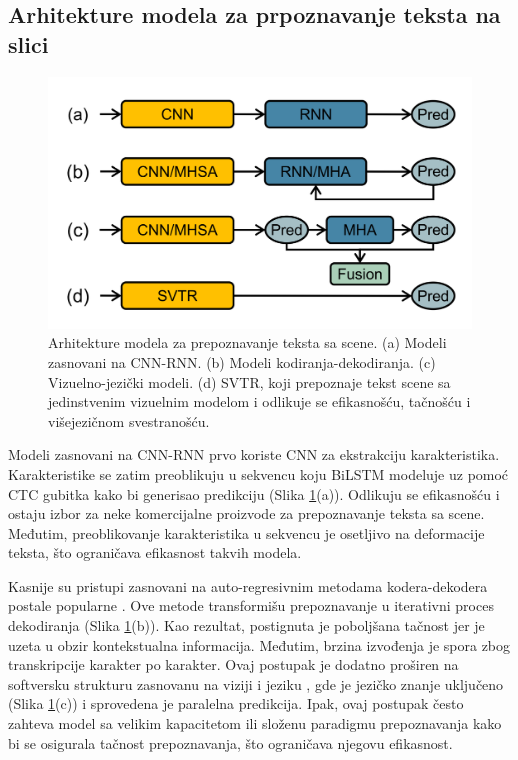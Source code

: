 \documentclass[a4paper,12pt]{article}
\begin{document}
	\subsection{Arhitekture modela za prpoznavanje teksta na slici}
	
	\begin{figure}[H]
		\centering
		\includegraphics[width=\textwidth]{assets/text-recognition-model-architectures.png}
		\caption{Arhitekture modela za prepoznavanje teksta sa scene. (a) Modeli zasnovani na CNN-RNN. (b) Modeli kodiranja-dekodiranja. (c) Vizuelno-jezički modeli. (d) SVTR, koji prepoznaje tekst scene sa jedinstvenim vizuelnim modelom i odlikuje se efikasnošću, tačnošću i višejezičnom svestranošću.}
		\label{fig:tr-model-architectures}
	\end{figure}
	
	Modeli zasnovani na CNN-RNN \cite{shi2015endtoend} prvo koriste CNN za ekstrakciju karakteristika. Karakteristike se zatim preoblikuju u sekvencu koju BiLSTM modeluje uz pomoć CTC gubitka kako bi generisao predikciju (Slika \ref{fig:tr-model-architectures}(a)). Odlikuju se efikasnošću i ostaju izbor za neke komercijalne proizvode za prepoznavanje teksta sa scene. Međutim, preoblikovanje karakteristika u sekvencu je osetljivo na deformacije teksta, što ograničava efikasnost takvih modela.
	
	Kasnije su pristupi zasnovani na auto-regresivnim metodama kodera-dekodera postale popularne \cite{sheng2019nrtr, li2019show, zheng2023cdistnet}. Ove metode transformišu prepoznavanje u iterativni proces dekodiranja (Slika \ref{fig:tr-model-architectures}(b)). Kao rezultat, postignuta je poboljšana tačnost jer je uzeta u obzir kontekstualna informacija. Međutim, brzina izvođenja je spora zbog transkripcije karakter po karakter. Ovaj postupak je dodatno proširen na softversku strukturu zasnovanu na viziji i jeziku \cite{yu2020accuratescenetextrecognition, fang2021readlikehumansautonomous}, gde je jezičko znanje uključeno (Slika \ref{fig:tr-model-architectures}(c)) i sprovedena je paralelna predikcija. Ipak, ovaj postupak često zahteva model sa velikim kapacitetom ili složenu paradigmu prepoznavanja kako bi se osigurala tačnost prepoznavanja, što ograničava njegovu efikasnost.
	
\end{document}
